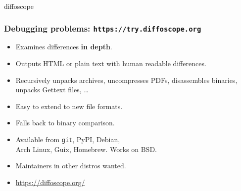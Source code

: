 \documentclass[14pt,aspectratio=169]{beamer}
\begin{document}
{

\begin{frame}{diffoscope}
 \frametitle{Debugging problems: \texttt{https://try.diffoscope.org}}

 \begin{itemize}
  \item Examines differences \textbf{in depth}.
  \item Outputs HTML or plain text with human readable differences.
  \item Recursively unpacks archives, uncompresses PDFs, disassembles
  binaries, unpacks Gettext files, …
  \item Easy to extend to new file formats.
  \item Falls back to binary comparison.
  \item Available from \texttt{git}, PyPI, Debian, \\
   Arch Linux, Guix, Homebrew. Works on BSD.
  \item Maintainers in other distros wanted.
  \item \url{https://diffoscope.org/}
 \end{itemize}
\end{frame}


}
\end{document}
